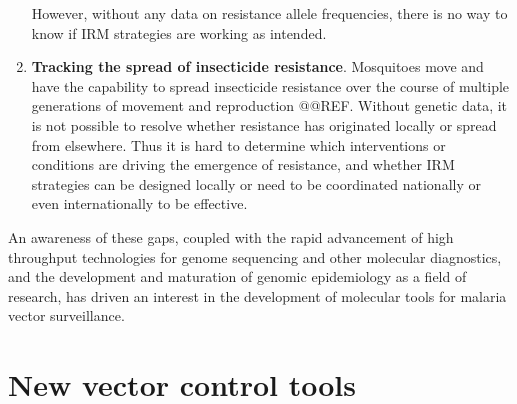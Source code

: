 \documentclass[a4paper,11pt,abstracton,hidelinks]{scrartcl}
\begin{document}
\begin{enumerate}
%
However, without any data on resistance allele frequencies, there is no way to know if IRM strategies are working as intended.
%
\item \textbf{Tracking the spread of insecticide resistance}. 
%
Mosquitoes move and have the capability to spread insecticide resistance over the course of multiple generations of movement and reproduction @@REF.
%
Without genetic data, it is not possible to resolve whether resistance has originated locally or spread from elsewhere.
%
Thus it is hard to determine which interventions or conditions are driving the emergence of resistance, and whether IRM strategies can be designed locally or need to be coordinated nationally or even internationally to be effective.
%
\end{enumerate}
%
An awareness of these gaps, coupled with the rapid advancement of high throughput technologies for genome sequencing and other molecular diagnostics, and the development and maturation of genomic epidemiology as a field of research, has driven an interest in the development of molecular tools for malaria vector surveillance.


\section{New vector control tools}
\end{document}
